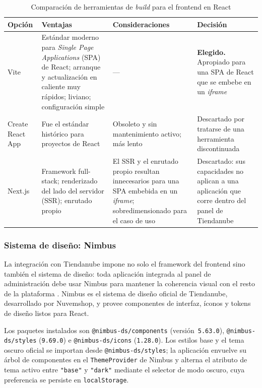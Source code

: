 \begin{table}[h]
\centering
\caption{Comparación de herramientas de \emph{build} para el frontend en React}
\label{tab:comparativo_bundler}
\renewcommand{\arraystretch}{1.3}
\begin{tabular}{|m{2.3cm}|m{4.4cm}|m{4.4cm}|m{3.4cm}|}
\hline
\textbf{Opción} & \textbf{Ventajas} & \textbf{Consideraciones} & \textbf{Decisión} \\
\hline
Vite & Estándar moderno para \emph{Single Page Applications} (SPA) de React; arranque y actualización en caliente muy rápidos; liviano; configuración simple & --- & \textbf{Elegido.} Apropiado para una SPA de React que se embebe en un \emph{iframe} \\
\hline
Create React App & Fue el estándar histórico para proyectos de React & Obsoleto y sin mantenimiento activo; más lento & Descartado por tratarse de una herramienta discontinuada \\
\hline
Next.js & Framework full-stack; renderizado del lado del servidor (SSR); enrutado propio & El SSR y el enrutado propio resultan innecesarios para una SPA embebida en un \emph{iframe}; sobredimensionado para el caso de uso & Descartado: sus capacidades no aplican a una aplicación que corre dentro del panel de Tiendanube \\
\hline
\end{tabular}
\end{table}

\subsubsection{Sistema de diseño: Nimbus}
\label{sec:nimbus}

La integración con Tiendanube impone no solo el framework del frontend sino también el sistema de diseño: toda aplicación integrada al panel de administración debe usar Nimbus para mantener la coherencia visual con el resto de la plataforma \parencite{TiendanubeAPI2024}. Nimbus es el sistema de diseño oficial de Tiendanube, desarrollado por Nuvemshop, y provee componentes de interfaz, íconos y tokens de diseño listos para React.

Los paquetes instalados son \texttt{@nimbus-ds/components} (versión~\texttt{5.63.0}), \texttt{@nimbus-ds/styles} (\texttt{9.69.0}) e \texttt{@nimbus-ds/icons} (\texttt{1.28.0}). Los estilos base y el tema oscuro oficial se importan desde \texttt{@nimbus-ds/styles}; la aplicación envuelve su árbol de componentes en el \texttt{ThemeProvider} de Nimbus y alterna el atributo de tema activo entre \texttt{"base"} y \texttt{"dark"} mediante el selector de modo oscuro, cuya preferencia se persiste en \texttt{localStorage}.

